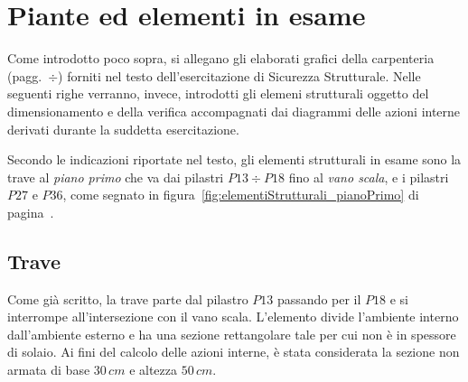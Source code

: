 \label{fig:piantaPianoTerra}

\label{fig:piantaPianoPrimo}

\label{fig:piantaPianoSecondo}

\label{fig:piantaCopertura}

\label{fig:sezione}


\chapter{Piante ed elementi in esame}\label{chap:piante}

Come introdotto poco sopra, si allegano gli elaborati grafici della carpenteria (pagg.~\pageref{fig:piantaPianoTerra}$\div$\pageref{fig:sezione}) forniti nel testo dell'esercitazione di Sicurezza Strutturale. Nelle seguenti righe verranno, invece, introdotti gli elemeni strutturali oggetto del dimensionamento e della verifica accompagnati dai diagrammi delle azioni interne derivati durante la suddetta esercitazione.


Secondo le indicazioni riportate nel testo, gli elementi strutturali in esame sono la trave al \emph{piano primo} che va dai pilastri $P13\div P18$ fino al \emph{vano scala}, e i pilastri $P27$ e $P36$, come segnato in figura~\ref{fig:elementiStrutturali_pianoPrimo} di pagina~\pageref{fig:elementiStrutturali_pianoPrimo}.

\section{Trave}

Come già scritto, la trave parte dal pilastro $P13$ passando per il $P18$ e si interrompe all'intersezione con il vano scala. L'elemento divide l'ambiente interno dall'ambiente esterno e ha una sezione rettangolare tale per cui non è in spessore di solaio. Ai fini del calcolo delle azioni interne, è stata considerata la sezione non armata di base $30\,cm$ e altezza $50\,cm$. 





